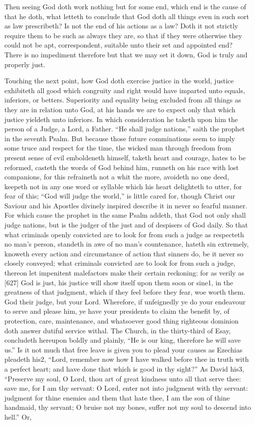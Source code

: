 Then seeing God doth work nothing but for some end, which end is the cause of that he doth, what letteth to conclude that God doth all things even in such sort as law prescribeth? Is not the end of his actions as a law? Doth it not strictly require them to be such as always they are, so that if they were otherwise they could not be apt, correspondent, suitable unto their set and appointed end? There is no impediment therefore but that we may set it down, God is truly and properly just.

Touching the next point, how God doth exercise justice in the world, justice exhibiteth all good which congruity and right would have imparted unto equals, inferiors, or betters. Superiority and equality being excluded from all things as they are in relation unto God, at his hands we are to expect only that which justice yieldeth unto inferiors. In which consideration he taketh upon him the person of a Judge, a Lord, a Father. “He shall judge nations,” saith the prophet in the seventh Psalm. But because those future comminations seem to imply some truce and respect for the time, the wicked man through freedom from present sense of evil emboldeneth himself, taketh heart and courage, hates to be reformed, casteth the words of God behind him, runneth on his race with lost companions, for this refraineth not a whit the more, avoideth no one deed, keepeth not in any one word or syllable which his heart delighteth to utter, for fear of this; “God will judge the world,” is little cared for, though Christ our Saviour and his Apostles divinely inspired describe it in never so fearful manner. For which cause the prophet in the same Psalm addeth, that God not only shall judge nations, but is the judger of the just and of despisers of God daily. So that what criminals openly convicted are to look for from such a judge as respecteth no man’s person, standeth in awe of no man’s countenance, hateth sin extremely, knoweth every action and circumstance of action that sinners do, be it never so closely conveyed; what criminals convicted are to look for from such a judge, thereon let impenitent malefactors make their certain reckoning: for as verily as [627] God is just, his justice will show itself upon them soon or sine1, in the greatness of that judgment, which if they feel before they fear, woe worth them. God their judge, but your Lord. Wherefore, if unfeignedly ye do your endeavour to serve and please him, ye have your presidents to claim the benefit by, of protection, care, maintenance, and whatsoever good thing righteous dominion doth answer dutiful service withal. The Church, in the thirty-third of Esay, concludeth hereupon boldly and plainly, “He is our king, therefore he will save us.” Is it not much that free leave is given you to plead your causes as Ezechias pleadeth his2, “Lord, remember now how I have walked before thee in truth with a perfect heart; and have done that which is good in thy sight?” As David his3, “Preserve my soul, O Lord, thou art of great kindness unto all that serve thee: save me, for I am thy servant: O Lord, enter not into judgment with thy servant: judgment for thine enemies and them that hate thee, I am the son of thine handmaid, thy servant; O bruise not my bones, suffer not my soul to descend into hell.” Or, 